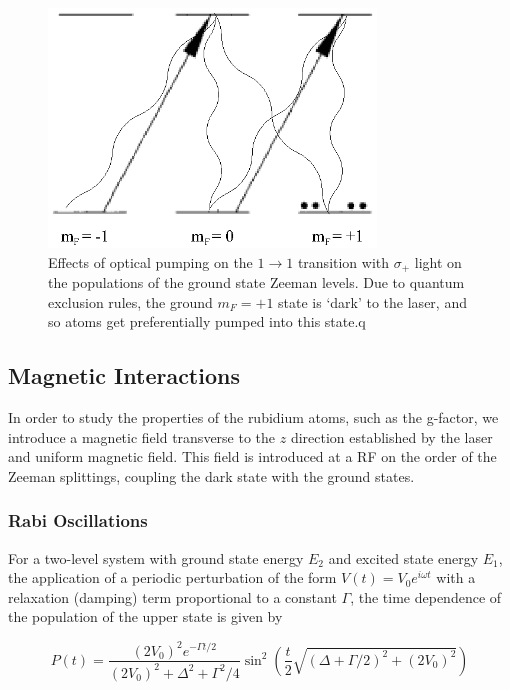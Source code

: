 \begin{figure}[h]
\begin{center}
\includegraphics[height=2.5in]{figures/rbpump.eps}
\caption{\small{Effects of optical pumping on the $1\rightarrow 1$
    transition with $\sigma_+$ light on the populations of the ground
    state Zeeman levels. Due to quantum exclusion rules, the ground
    $m_F = +1$ state is `dark' to the laser, and so atoms get
    preferentially pumped into this state.q}}
\label{fig:fluor}
\end{center}
\end{figure}


\subsection{Magnetic Interactions}

In order to study the properties of the rubidium atoms, such as the
g-factor, we introduce a magnetic field transverse to the $z$
direction established by the laser and uniform magnetic field. This
field is introduced at a RF on the order of the Zeeman splittings,
coupling the dark state with the ground states. 

\subsubsection{Rabi Oscillations}

For a two-level system with ground state energy $E_2$ and excited
state energy $E_1$, the application of a periodic perturbation of the
form $V(t) = V_0e^{i\omega t}$ with a relaxation (damping) term
proportional to a constant $\Gamma$, the time dependence of the
population of the upper state is given by

\begin{equation}
P(t) = \frac{(2V_0)^2e^{-\Gamma t/2}}{(2V_0)^2 +\Delta^2 + \Gamma^2/4}\sin^2(\frac{t}{2}\sqrt{(\Delta + \Gamma/2)^2 + (2V_0)^2})
\end{equation}

